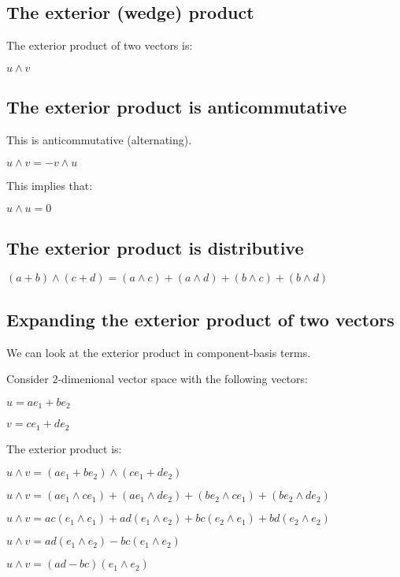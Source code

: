 
\subsection{The exterior (wedge) product}

The exterior product of two vectors is:

\(u\land v\)

\subsection{The exterior product is anticommutative}

This is anticommutative (alternating).

\(u\land v=-v\land u\)

This implies that:

\(u\land u=0\)

\subsection{The exterior product is distributive}

\((a+b)\land (c+d)=(a\land c)+(a\land d)+(b\land c)+(b\land d)\)

\subsection{Expanding the exterior product of two vectors}

We can look at the exterior product in component-basis terms.

Consider \(2\)-dimenional vector space with the following vectors:

\(u=ae_1+be_2\)

\(v=ce_1+de_2\)

The exterior product is:

\(u\land v=(ae_1+be_2)\land (ce_1+de_2)\)

\(u\land v=(ae_1\land ce_1)+(ae_1\land de_2)+(be_2\land ce_1)+(be_2\land de_2)\)

\(u\land v=ac(e_1\land e_1)+ad(e_1\land e_2)+bc(e_2\land e_1)+bd(e_2\land e_2)\)

\(u\land v=ad(e_1\land e_2)-bc(e_1\land e_2)\)

\(u\land v=(ad-bc)(e_1\land e_2)\)

